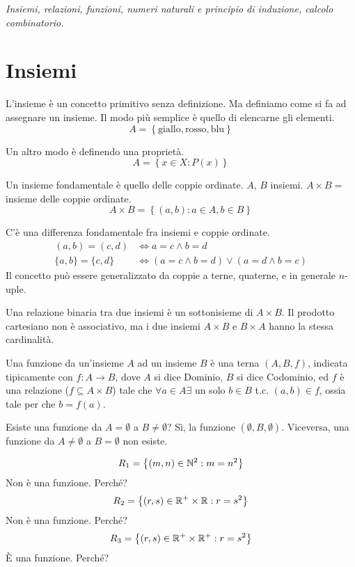\begin{center}
\indent
\textit{Insiemi, relazioni, funzioni, numeri naturali e principio di induzione, calcolo combinatorio.}
\end{center}

\section{Insiemi}

L'insieme \`e un concetto primitivo senza definizione. Ma definiamo come si fa ad assegnare un insieme. Il modo pi\`u semplice \`e quello di elencarne gli elementi. 
\[
A = \left\{ \text{giallo}, \text{rosso}, \text{blu} \right\}
\]

Un altro modo \`e definendo una propriet\`a.
\[
A = \left\{ x \in X : P(x) \right\}
\]

Un insieme fondamentale \`e quello delle coppie ordinate. $A$, $B$ insiemi. $A \times B =$ insieme delle coppie ordinate.
\[
A \times B = \left\{ (a,b) : a \in A, b \in B \right\}
\]

C'\`e una differenza fondamentale fra insiemi e coppie ordinate.
\begin{align*}
(a,b) = (c,d) &\iff a = c \land b = d \\
\{a,b\} = \{c,d\} &\iff (a = c \land b = d) \lor (a = d \land b = c)
\end{align*}
Il concetto pu\`o essere generalizzato da coppie a terne, quaterne, e in generale $n$-uple.

Una relazione binaria tra due insiemi \`e un sottonisieme di $A \times B$. Il prodotto cartesiano non \`e associativo, ma i due insiemi $A \times B$ e $B \times A$ hanno la stessa cardinalit\`a.

Una funzione da un'insieme $A$ ad un insieme $B$ \`e una terna $(A, B, f)$, indicata tipicamente con $f : A \to B$, dove $A$ si dice Dominio, $B$ si dice Codominio, ed $f$ \`e una relazione ($f \subseteq A \times B$) tale che $\forall a \in A \exists $ un solo $ b \in B $ t.c. $ (a,b) \in f$, ossia tale per che $b = f(a)$.

Esiste una funzione da $A = \emptyset$ a $B \neq \emptyset$? S\`i, la funzione $(\emptyset, B, \emptyset)$. Viceversa, una funzione da $A \neq \emptyset$ a $B = \emptyset$ non esiste.

\[
R_1 = \left\{ (m, n) \in \mathbb{N}^2 : m = n^2 \right\}
\]
Non \`e una funzione. Perch\'e? 
\[
R_2 = \left\{ (r, s) \in \mathbb{R}^+ \times \mathbb{R} : r = s^2 \right\}
\]
Non \`e una funzione. Perch\'e?
\[
R_3 = \left\{ (r, s) \in \mathbb{R}^+ \times \mathbb{R}^+ : r = s^2 \right\}
\]
\`E una funzione. Perch\'e?

